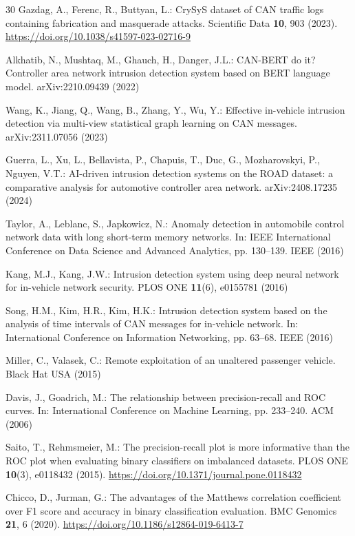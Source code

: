 \documentclass[runningheads]{llncs}
\providecommand{\doi}[1]{\url{https://doi.org/#1}}
\begin{document}
\begin{thebibliography}{30}
Gazdag, A., Ferenc, R., Buttyan, L.: CrySyS dataset of CAN traffic logs containing fabrication and masquerade attacks. Scientific Data \textbf{10}, 903 (2023). \doi{10.1038/s41597-023-02716-9}

Alkhatib, N., Mushtaq, M., Ghauch, H., Danger, J.L.: CAN-BERT do it? Controller area network intrusion detection system based on BERT language model. arXiv:2210.09439 (2022)

Wang, K., Jiang, Q., Wang, B., Zhang, Y., Wu, Y.: Effective in-vehicle intrusion detection via multi-view statistical graph learning on CAN messages. arXiv:2311.07056 (2023)

Guerra, L., Xu, L., Bellavista, P., Chapuis, T., Duc, G., Mozharovskyi, P., Nguyen, V.T.: AI-driven intrusion detection systems on the ROAD dataset: a comparative analysis for automotive controller area network. arXiv:2408.17235 (2024)

Taylor, A., Leblanc, S., Japkowicz, N.: Anomaly detection in automobile control network data with long short-term memory networks. In: IEEE International Conference on Data Science and Advanced Analytics, pp. 130--139. IEEE (2016)

Kang, M.J., Kang, J.W.: Intrusion detection system using deep neural network for in-vehicle network security. PLOS ONE \textbf{11}(6), e0155781 (2016)

Song, H.M., Kim, H.R., Kim, H.K.: Intrusion detection system based on the analysis of time intervals of CAN messages for in-vehicle network. In: International Conference on Information Networking, pp. 63--68. IEEE (2016)

Miller, C., Valasek, C.: Remote exploitation of an unaltered passenger vehicle. Black Hat USA (2015)

Davis, J., Goadrich, M.: The relationship between precision-recall and ROC curves. In: International Conference on Machine Learning, pp. 233--240. ACM (2006)

Saito, T., Rehmsmeier, M.: The precision-recall plot is more informative than the ROC plot when evaluating binary classifiers on imbalanced datasets. PLOS ONE \textbf{10}(3), e0118432 (2015). \doi{10.1371/journal.pone.0118432}

Chicco, D., Jurman, G.: The advantages of the Matthews correlation coefficient over F1 score and accuracy in binary classification evaluation. BMC Genomics \textbf{21}, 6 (2020). \doi{10.1186/s12864-019-6413-7}


\end{thebibliography}
\end{document}
